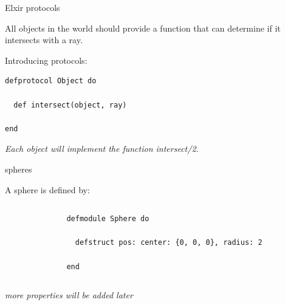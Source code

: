 \begin{frame}[fragile]{Elxir protocols}

  All objects in the world should provide a function that can
  determine if it intersects with a ray.

  \pause

  Introducing protocols:
  
\begin{verbatim}
defprotocol Object do

  def intersect(object, ray)

end
\end{verbatim}

\pause\vspace{20pt}

{\em  Each object will implement the function intersect/2.}
  
\end{frame}



\begin{frame}[fragile]{spheres}

A sphere is defined by:
\vspace{20pt}\pause

\begin{columns}[T]
 \begin{column}{0.3\linewidth}

 \end{column}
\pause
 \begin{column}{0.7\linewidth}
\begin{verbatim}
defmodule Sphere do

  defstruct pos: center: {0, 0, 0}, radius: 2

end
\end{verbatim}

 \end{column}
\end{columns}

\vspace{20pt}\pause
{\em more properties will be added later}
\end{frame}

